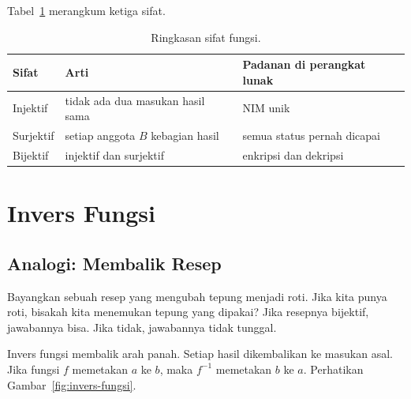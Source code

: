 \documentclass[11pt,a4paper]{article}
\begin{document}
Tabel~\ref{tab:sifat-fungsi} merangkum ketiga sifat.

\begin{table}[H]
	\centering
	\caption{Ringkasan sifat fungsi.}
	\label{tab:sifat-fungsi}
	\small
	\begin{tabularx}{\textwidth}{l X X}
		\toprule
		Sifat     & Arti                              & Padanan di perangkat lunak  \\
		\midrule
		Injektif  & tidak ada dua masukan hasil sama  & NIM unik                    \\
		Surjektif & setiap anggota $B$ kebagian hasil & semua status pernah dicapai \\
		Bijektif  & injektif dan surjektif            & enkripsi dan dekripsi       \\
		\bottomrule
	\end{tabularx}
\end{table}

\section{Invers Fungsi}

\subsection{Analogi: Membalik Resep}

Bayangkan sebuah resep yang mengubah tepung menjadi roti. Jika kita punya roti, bisakah kita menemukan tepung yang dipakai? Jika resepnya bijektif, jawabannya bisa. Jika tidak, jawabannya tidak tunggal.

Invers fungsi membalik arah panah. Setiap hasil dikembalikan ke masukan asal. Jika fungsi $f$ memetakan $a$ ke $b$, maka $f^{-1}$ memetakan $b$ ke $a$. Perhatikan Gambar~\ref{fig:invers-fungsi}.
\end{document}
